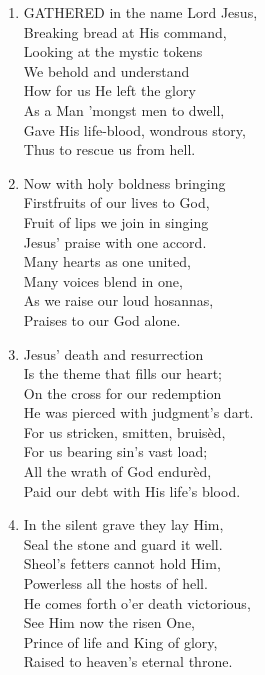 \documentclass[11pt,a4paper]{article}
\begin{document}
\begin{enumerate}
    \item GATHERED in the name Lord Jesus, \\
        Breaking bread at His command, \\
        Looking at the mystic tokens \\
        We behold and understand \\
        How for us He left the glory \\
        As a Man 'mongst men to dwell, \\
        Gave His life-blood, wondrous story, \\
        Thus to rescue us from hell.

    \item Now with holy boldness bringing \\
        Firstfruits of our lives to God, \\
        Fruit of lips we join in singing \\
        Jesus' praise with one accord. \\
        Many hearts as one united, \\
        Many voices blend in one, \\
        As we raise our loud hosannas, \\
        Praises to our God alone.

    \item Jesus' death and resurrection \\
        Is the theme that fills our heart; \\
        On the cross for our redemption \\
        He was pierced with judgment's dart. \\
        For us stricken, smitten, bruis\`ed, \\
        For us bearing sin's vast load; \\
        All the wrath of God endur\`ed, \\
        Paid our debt with His life's blood.

    \item In the silent grave they lay Him, \\
        Seal the stone and guard it well. \\
        Sheol's fetters cannot hold Him, \\
        Powerless all the hosts of hell. \\
        He comes forth o'er death victorious, \\
        See Him now the risen One, \\
        Prince of life and King of glory, \\
        Raised to heaven's eternal throne.


\end{enumerate}
\end{document}

